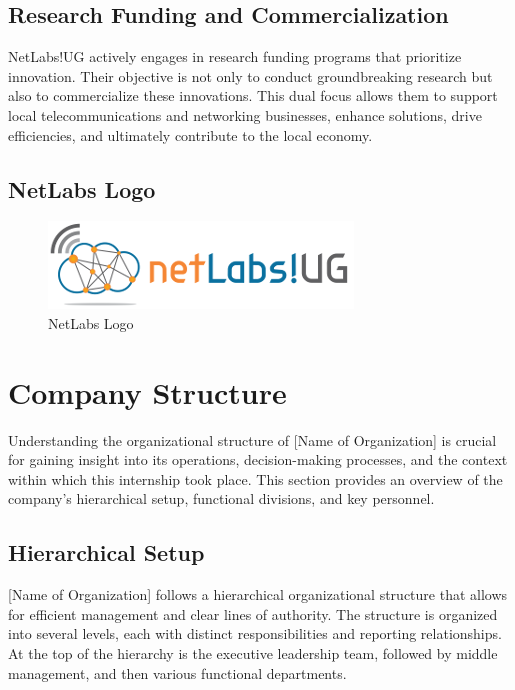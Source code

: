 \subsection{Research Funding and Commercialization}

NetLabs!UG actively engages in research funding programs that prioritize innovation. Their objective is not only to conduct groundbreaking research but also to commercialize these innovations. This dual focus allows them to support local telecommunications and networking businesses, enhance solutions, drive efficiencies, and ultimately contribute to the local economy.

\subsection{NetLabs Logo}

\begin{figure}[H]
    \centering
    \includegraphics{images/netlabs-logo.png}
    \caption{NetLabs Logo}
\end{figure}


\section{Company Structure}

Understanding the organizational structure of [Name of Organization] is crucial for gaining insight into its operations, decision-making processes, and the context within which this internship took place. This section provides an overview of the company's hierarchical setup, functional divisions, and key personnel.

\subsection{Hierarchical Setup}

[Name of Organization] follows a hierarchical organizational structure that allows for efficient management and clear lines of authority. The structure is organized into several levels, each with distinct responsibilities and reporting relationships. At the top of the hierarchy is the executive leadership team, followed by middle management, and then various functional departments.

